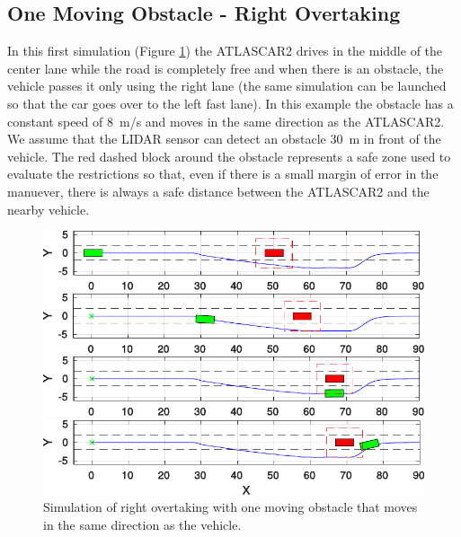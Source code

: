 \subsection{One Moving Obstacle - Right Overtaking}
In this first simulation
(Figure \ref{fig:obstacleAvoidance_one_obstacle}) the ATLASCAR2 drives in the middle of the center lane while the road is completely free and when there is an obstacle, the vehicle passes it only using the right lane (the same simulation can be launched so that the car goes over to the left fast lane). In this example the obstacle has a constant speed of \SI{8}{m/s} and moves in the same direction as the ATLASCAR2. We assume that the LIDAR sensor can detect an obstacle \SI{30}{m} in front of the vehicle.
The red dashed block around the obstacle represents a safe zone used to evaluate the restrictions so that, even if there is a small margin of error in the manuever, there is always a safe distance between the ATLASCAR2 and the nearby vehicle.
\begin{figure}[h!]
	\centering
	\begin{minipage}[t]{\textwidth}
		\includegraphics[width=\textwidth]{./figure/one_obstacle_right_overtaking/overtaking_start.pdf}
	\end{minipage}
	\begin{minipage}[t]{\textwidth}
		\includegraphics[width=\textwidth]{./figure/one_obstacle_right_overtaking/overtaking_middle.pdf}
	\end{minipage}
	\begin{minipage}[t]{\textwidth}
		\includegraphics[width=\textwidth]{./figure/one_obstacle_right_overtaking/overtaking_middle_end.pdf}
	\end{minipage}
	\begin{minipage}[t]{\textwidth}
		\includegraphics[width=\textwidth]{./figure/one_obstacle_right_overtaking/overtaking_end.pdf}
	\end{minipage}
	\caption{Simulation of right overtaking with one moving obstacle that moves in the same direction as the vehicle.}
	\label{fig:obstacleAvoidance_one_obstacle}
\end{figure}

